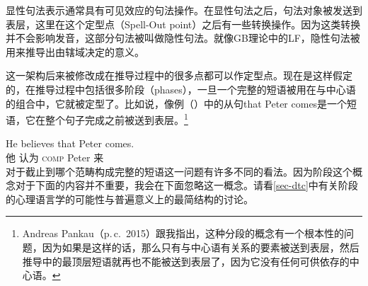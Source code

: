 显性句法表示通常具有可见效应的句法操作。在显性句法之后，句法对象被发送到表层，这里在这个定型点（Spell-Out point）之后有一些转换操作。因为这类转换并不会影响发音，这部分句法被叫做隐性句法。就像GB理论中的LF，隐性句法被用来推导出由辖域决定的意义。

这一架构后来被修改成在推导过程中的很多点都可以作定型点。现在是这样假定的，在推导过程中包括很多阶段（phases），一旦一个完整的短语被用在与中心语的组合中\citep{Chomsky2008a}，它就被定型了。比如说，像例（）中的从句that Peter comes是一个短语，它在整个句子完成之前被送到表层。\footnote{%
Andreas Pankau（p.\,c.\, 2015）跟我指出，这种分段的概念有一个根本性的问题，因为如果是这样的话，那么只有与中心语有关系的要素被送到表层，然后推导中的最顶层短语就再也不能被送到表层了，因为它没有任何可供依存的中心语。
}

\ea
\gll He believes that Peter comes.\\
他 认为 \textsc{comp} Peter 来\\
\z
对于截止到哪个范畴构成完整的短语这一问题有许多不同的看法。因为阶段这个概念对于下面的内容并不重要，我会在下面忽略这一概念。请看\ref{sec-dtc}中有关阶段的心理语言学的可能性与普遍意义上的最简结构的讨论。

